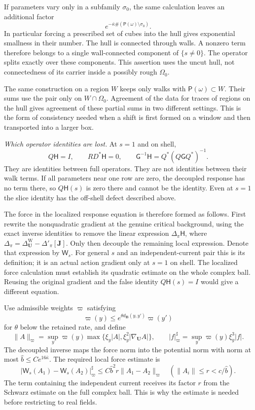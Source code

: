 \documentclass[11pt,letterpaper,reqno]{amsart}
\theoremstyle{definition}
\theoremstyle{remark}
\begin{document}
If parameters vary only in a subfamily $\sigma_0$,
the same calculation leaves an additional factor
\[
 e^{-\bar\kappa\#(\mathsf P(\omega)\setminus\sigma_0)}.
\]
In particular forcing a prescribed set of cubes into
the hull gives exponential smallness in their number.
The hull is connected through walls. A nonzero term
therefore belongs to a single wall-connected component
of $\{s\ne0\}$. The operator splits exactly over these
components. This assertion uses the uncut hull, not
connectedness of its carrier inside a possibly rough
$\Omega_0$.

The same construction on a region $W$ keeps only walks
with $\mathsf P(\omega)\subset W$. Their sums use the
pair only on $W\cap\Omega_0$. Agreement of the data
for traces of regions on the hull gives agreement of
these partial sums in two different settings. This is
the form of consistency needed when a shift is first
formed on a window and then transported into a larger
box.

\emph{Which operator identities are lost.}
At $s=1$ and on shell,
\[
 Q\mathsf H=I,\qquad RD^*\mathsf H=0,\qquad
 \mathsf G^{-1}\mathsf H=Q^*(Q\mathsf GQ^*)^{-1}.
\]
They are identities between full operators. They are
not identities between their walk terms. If all
parameters near one row are zero, the decoupled
response has no term there, so $Q\mathsf H(s)$ is
zero there and cannot be the identity. Even at
$s=1$ the slice identity has the off-shell defect
described above.

The force in the localized response equation is
therefore formed as follows. First rewrite the
nonquadratic gradient at the genuine critical
background, using the exact inverse identities to
remove the linear expression $\Delta_\pi\mathsf H$, where
$\Delta_\pi=\Delta^{\mathrm W}_{\mathbf U}-\Delta'_\pi[\mathbf J]$.
Only then decouple the remaining local expression.
Denote that expression by $\mathsf W_s$. For general
$s$ and an independent-current pair this is its
definition; it is an actual action gradient only
at $s=1$ on shell. The localized force calculation
must establish its quadratic estimate on the
whole complex ball. Reusing the original gradient
and the false identity $Q\mathsf H(s)=I$ would
give a different equation.

Use admissible weights $\varpi$ satisfying
\[
 \varpi(y)\le e^{\theta d_{\mathbf B}(y,y')}\varpi(y')
\]
for $\theta$ below the retained rate, and define
\[
 \|A\|_\varpi=\sup_y\varpi(y)
              \max\{\xi_y|A|,\xi_y^2|\nabla_{\mathbf U}A|\},
 \qquad |f|^\sharp_\varpi=\sup_y\varpi(y)\xi_y^3|f|.
\]
The decoupled inverse maps the force norm into
the potential norm with norm at most
$\widehat b\le Ce^{16\bar\kappa}$. The required
local force estimate is
\[
 |\mathsf W_s(A_1)-\mathsf W_s(A_2)|^\sharp_\varpi
       \le C\widehat b^2r\|A_1-A_2\|_\varpi
       \quad(\|A_i\|\le r<c/\widehat b).
\]
The term containing the independent current
receives its factor $r$ from the Schwarz estimate
on the full complex ball. This is why the
estimate is needed before restricting to
real fields.
\end{document}
